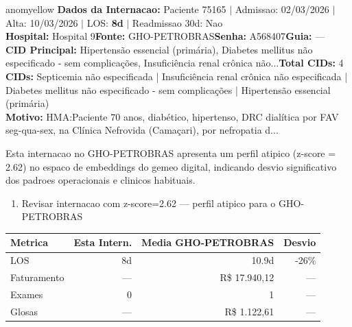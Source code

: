 \documentclass[a4paper,10pt]{article}
\begin{document}
\begin{anomalycard}[Internacao 167357 | GHO-PETROBRAS | MODERADO (z=2.62)]{anomyellow}
\textbf{Dados da Internacao:} Paciente 75165 $\mid$ Admissao: 02/03/2026 $\mid$ Alta: 10/03/2026 $\mid$ LOS: \textbf{8d} $\mid$ Readmissao 30d: Nao\\
\textbf{Hospital:} Hospital 9\quad\textbf{Fonte:} GHO-PETROBRAS\quad\textbf{Senha:} A568407\quad\textbf{Guia:} ---\\
\textbf{CID Principal:} {\small Hipertensão essencial (primária), Diabetes mellitus não especificado - sem complicações, Insuficiência renal crônica não...}\quad\textbf{Total CIDs:} 4\\

\textbf{CIDs:} {\scriptsize Septicemia não especificada | Insuficiência renal crônica não especificada | Diabetes mellitus não especificado - sem complicações | Hipertensão essencial (primária)}\\

\textbf{Motivo:} {\scriptsize HMA:Paciente  70 anos, diabético, hipertenso, DRC dialítica por FAV seg-qua-sex, na Clínica Nefrovida (Camaçari), por nefropatia d...}\\

\vspace{2pt}\begin{tcolorbox}[colback=severityred!20,colframe=anomyellow,title={\textbf{Interpretacao de Negocio}},fonttitle=\bfseries\small,left=4pt,right=4pt,top=3pt,bottom=3pt]
{\small Esta internacao no GHO-PETROBRAS apresenta um perfil atipico (z-score = 2.62) no espaco de embeddings do gemeo digital, indicando desvio significativo dos padroes operacionais e clinicos habituais.}
\end{tcolorbox}
\begin{tcolorbox}[colback=severityyellow!30,colframe=anomorange,title={\textbf{Recomendacoes Especificas}},fonttitle=\bfseries\small,left=4pt,right=4pt,top=3pt,bottom=3pt]
\begin{enumerate}[nosep,leftmargin=16pt]
\item {\small Revisar internacao com z-score=2.62 --- perfil atipico para o GHO-PETROBRAS}
\end{enumerate}
\end{tcolorbox}
\begin{center}\begin{tabular}{l r r r}\toprule\textbf{Metrica} & \textbf{Esta Intern.} & \textbf{Media GHO-PETROBRAS} & \textbf{Desvio} \\\midrule
LOS & 8d & 10.9d & -26\% \\
Faturamento & --- & R\$ 17.940,12 & --- \\
Exames & 0 & 1 & --- \\
Glosas & --- & R\$ 1.122,61 & --- \\
\bottomrule\end{tabular}\end{center}


\end{anomalycard}
\end{document}
